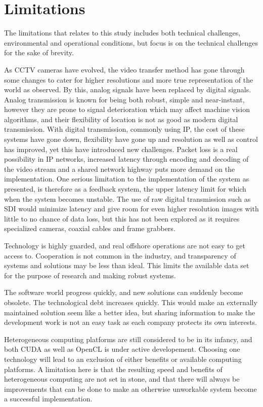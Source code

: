 \section{Limitations}
The limitations that relates to this study includes both technical challenges, environmental and operational conditions, but focus is on the technical challenges for the sake of brevity.

As CCTV cameras have evolved, the video transfer method has gone through some changes to cater for higher resolutions and more true representation of the world as observed. By this, analog signals have been replaced by digital signals. Analog transmission is known for being both robust, simple and near-instant, however they are prone to signal deterioration which may affect machine vision algorithms, and their flexibility of location is not as good as modern digital transmission. With digital transmission, commonly using IP, the cost of these systems have gone down, flexibility have gone up and resolution as well as control has improved, yet this have introduced new challenges. Packet loss is a real possibility in IP networks, increased latency through encoding and decoding of the video stream and a shared network highway puts more demand on the implementation. One serious limitation to the implementation of the system as presented, is therefore as a feedback system, the upper latency limit for which when the system becomes unstable. The use of raw digital transmission such as SDI would minimize latency and give room for even higher resolution images with little to no chance of data loss, but this has not been explored as it requires specialized cameras, coaxial cables and frame grabbers.

Technology is highly guarded, and real offshore operations are not easy to get access to. Cooperation is not common in the industry, and transparency of systems and solutions may be less than ideal. This limits the available data set for the purpose of research and making robust systems.

The software world progress quickly, and new solutions can suddenly become obsolete. The technological debt increases quickly. This would make an externally maintained solution seem like a better idea, but sharing information to make the development work is not an easy task as each company protects its own interests.

Heterogeneous computing platforms are still considered to be in its infancy, and both CUDA as well as OpenCL is under active developement. Choosing one technology will lead to an exclusion of either benefits or available computing platforms. A limitation here is that the resulting speed and benefits of heterogeneous computing are not set in stone, and that there will always be improvements that can be done to make an otherwise unworkable system become a successful implementation.

